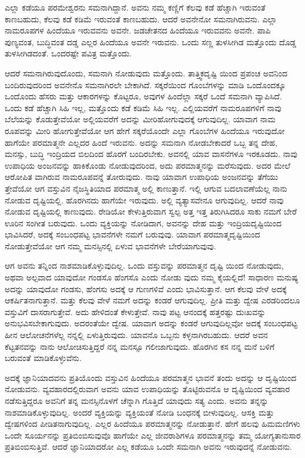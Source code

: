 ಎಲ್ಲಾ ಕಡೆಯೂ ಪರಮೇಶ್ವರನು ಸಮನಾಗಿದ್ದಾನೆ. ಅವನು ನಮ್ಮ ಕಣ್ಣಿಗೆ ಕೆಲವು ಕಡೆ ಹೆಚ್ಚಾಗಿ ಇರುವಂತೆ ಕಾಣಬಹುದು, ಕೆಲವು ಕಡೆ ಕಡಿಮೆ ಇರುವಂತೆ ಕಾಣಬಹುದು. ಆದರೆ ಅವನೇನೋ ಸಮನಾಗಿರುವನು. ಎಲ್ಲಾ ನಾಮರೂಪಗಳ ಹಿಂದೆಯೂ ಇರುವವನು ಅವನೇ. ಜಡಚೇತನದ ಹಿಂದೆಯೂ ಇರುವವನು ಅವನೇ. ಪಾಪಿ ಪುಣ್ಯವಂತ, ಬುದ್ಧಿವಂತ ದಡ್ಡ ಎಲ್ಲರ ಹಿಂದೆಯೂ ಅವನೇ ಇರುವನು. ಒಂದು ಸಣ್ಣ ತುಳಸೀಗಿಡ ಮತ್ತೊಂದು ದೊಡ್ಡ ತುಳಸೀಗಿಡದಂತೆ. ಒಂದರಷ್ಟೇ ಪವಿತ್ರ ಮತ್ತೊಂದು.

ಆದರೆ ಸಮನಾಗಿರುವುದೊಂದು, ಸಮನಾಗಿ ನೋಡುವುದು ಮತ್ತೊಂದು. ತಾತ್ತ್ವಿಕದೃಷ್ಟಿ ಯಿಂದ ಪ್ರಪಂಚ ಅವನಿಂದ ಬಂದಿರುವುದರಿಂದ ಅವನೇನೊ ಸಮನಾಗಿರಲೇ ಬೇಕಾಗಿದೆ. ಸಕ್ಕರೆಯಿಂದ ಗೊಂಬೆಗಳನ್ನು ಮಾಡಿ ಒಂದೊಂದಕ್ಕೂ ಒಂದೊಂದು ಹೆಸರು ಮತ್ತು ಆಕಾರಗಳನ್ನು ಕೊಟ್ಟರೂ, ಅವುಗಳ ಹಿಂದೆಲ್ಲಾ ಸಕ್ಕರೆ ಒಂದೆ ಸಮನಾಗಿ ವ್ಯಾಪಿಸಿದೆ. ಒಂದು ಕಡೆ ಹೆಚ್ಚಾಗಿ ಸಿಹಿ ಇಲ್ಲ, ಮತ್ತೊಂದು ಕಡೆ ಕಡಿಮೆ ಸಿಹಿ ಇಲ್ಲ. ಎಲ್ಲಿಯವರೆಗೆ ನಾಮರೂಪಗಳಿಗೆ ನಾವು ಬೆಲೆಯನ್ನು ಕೊಡುತ್ತೇವೆಯೋ ಅಲ್ಲಿಯವರೆಗೆ ಅದನ್ನು ಮೀರಿಹೋಗುವುದಕ್ಕೆ ಆಗುವುದಿಲ್ಲ. ಯಾವಾಗ ನಾಮ ರೂಪವನ್ನು ಮೀರಿ ಹೋಗುತ್ತೇವೆಯೋ ಆಗ ಹೇಗೆ ಸಕ್ಕರೆಯೊಂದೇ ಎಲ್ಲಾ ಗೊಂಬೆಗಳ ಹಿಂದೆಯೂ ಇರುವುದೋ ಹಾಗೆಯೇ ಪರಮಾತ್ಮನೇ ಎಲ್ಲದರ ಹಿಂದೆ ಇರುವನು. ಅದನ್ನು ಸಮನಾಗಿ ನೋಡಬೇಕಾದರೆ ಒಬ್ಬ ತನ್ನ ದೇಹ, ಮನಸ್ಸು, ಬುದ್ಧಿ ಇಂದ್ರಿಯದ ಬಿಲದಿಂದ ಹೊರಗೆ ಬಂದಿರಬೇಕು. ಅವನಲ್ಲಿ ಯಾವ ವಾಸನೆಗಳೂ ಇರಕೂಡದು. ನಾವು ಉಪಾಧಿಯ ಅಂಜನವನ್ನು ಹಾಕಿಕೊಂಡು ನೋಡುವುದರಿಂದ, ಅದು ಪರಮಾತ್ಮನನ್ನು ಮರೆಸುವುದು. ಅದರ ಮೇಲೆ ಆರೋಪಿತ ವಾಗಿರುವ ನಾಮರೂಪವನ್ನೆ ತೋರುವುದು. ನಾವು ಯಾವಾಗ ಉಪಾಧಿಯ ಅಂಜನವನ್ನು ತೆಗೆಯು ತ್ತೇವೆಯೋ ಆಗ ವಸ್ತುವಿನ ನೈಜಸ್ಥಿತಿಯಾದ ಪರಮಾತ್ಮ ಅಲ್ಲಿ ಕಾಣುತ್ತಾನೆ. ಇಲ್ಲಿ ಆಗುವ ಬದಲಾವಣೆಯೆಲ್ಲ ನಾನು ನೋಡುವ ದೃಷ್ಟಿಯಲ್ಲಿ. ಹೊರಗಿನದು ಹಾಗೆಯೇ ಇರುವುದು. ಅಲ್ಲಿ ವ್ಯತ್ಯಾಸವೇನೂ ಆಗುವುದಿಲ್ಲ. ಆದರೆ ನಾವು ನೋಡುವ ದೃಷ್ಟಿಯಲ್ಲಿ ಕಾಣುವುದು. ರೇಡಿಯೋ ಕೇಳುತ್ತಿರುವಾಗ ಸ್ವಲ್ಪ ಅತ್ತ ಇತ್ತ ತಿರುಗಿಸಿದರೂ ಸಾಕು ನಮಗೆ ಬೇರೆ ಊರಿನ ಸಂಗೀತ ಬರುವುದು. ಒಂದು ವ್ಯಕ್ತಿಯನ್ನು ನೋಡಿದಾಗ, ಅವನನ್ನು ದೇಹ ಮತ್ತು ಇಂದ್ರಿಯದೃಷ್ಟಿಯಿಂದ ಭಾವಿಸಿದರೆ, ಅದಕ್ಕೆ ಸಂಬಂಧಪಟ್ಟ ಭಾವನೆಗಳೇ ನಮಗೆ ಬರುವುವು. ಯಾವಾಗ ಪರಮಾತ್ಮದೃಷ್ಟಿಯಿಂದ ನೋಡುತ್ತೇವೆಯೋ ಆಗ ನಮ್ಮ ಮನಸ್ಸಿನಲ್ಲಿ ಏಳುವ ಭಾವನೆಗಳೇ ಬೇರೆಯಾಗುವುವು.

ಆಗ ಅವನು ತನ್ನಿಂದ ನಾಶಮಾಡಿಕೊಳ್ಳುವುದಿಲ್ಲ. ಒಂದು ವಸ್ತುವನ್ನು ಪರಮಾತ್ಮನ ದೃಷ್ಟಿ ಯಿಂದ ನೋಡುವುದು, ಅಥವಾ ಅಲ್ಪವಾದ ಯಾವುದೋ ಗಂಡಸೊ ಹೆಂಗಸೊ ಎಂದು ನೋಡು ವುದು ನಮ್ಮ ಕೈಯಲ್ಲಿದೆ! ಸಾಧಾರಣ ಮನುಷ್ಯ ಅದನ್ನು ಯಾವುದೋ ಗಂಡಸು, ಹೆಂಗಸು ಅದಕ್ಕೆ ಆ ಗುಣಗಳಿವೆ ಎಂದು ಭಾವಿಸುತ್ತಾನೆ. ಆಗ ಕೆಲವು ವೇಳೆ ಅದಕ್ಕೆ ಆಕರ್ಷಿತನಾಗುತ್ತಾನೆ. ಮತ್ತು ಕೆಲವು ವೇಳೆ ನಮಗೆ ಅದನ್ನು ಕಂಡರೆ ಆಗುವುದಿಲ್ಲ. ಪ್ರೀತಿ ಮತ್ತು ದ್ವೇಷ ಎರಡರಿಂದಲೂ ವಸ್ತುವಿಗೆ ದಾಸರಾಗುತ್ತೇವೆ. ಅದು ಹೇಳಿದಂತೆ ಕೇಳುತ್ತೇವೆ. ನಾವು ಪಟ್ಟ ಆನಂದಕ್ಕೆ ಹತ್ತರಷ್ಟು ದುಃಖವನ್ನು ಅನುಭವಿಸಬೇಕಾಗುವುದು. ಅದರಂತೆಯೇ ದ್ವೇಷ. ಯಾವಾಗ ಅದನ್ನು ಕಂಡರೆ ಆಗುವುದಿಲ್ಲವೋ ಅದಕ್ಕೆ ಸಂಬಂಧಪಟ್ಟ ಹೀನ ಆಲೋಚನೆಗಳೆಲ್ಲ ನನ್ನಲ್ಲಿ ಏಳುತ್ತಿರುವುದು. ಯಾವನೊ ಒಬ್ಬನು ಕಳ್ಳನಾಗಿರಬಹುದು. ಆದರೆ ಅವನ ಕೆಟ್ಟತನವನ್ನು ನಾನು ಆಲೋಚಿಸುತ್ತಿದ್ದರೆ ನನ್ನ ಮನಸ್ಸೂ ಗಲೀಜಾಗುವುದು. ಹೊರಗಿನ ಕಸ ನನ್ನ ಮನೆ ಬಳಿಗೆ ಬರುವಂತೆ ಮಾಡಿಕೊಳ್ಳುವೆನು.

ಅದಕ್ಕೆ ಜ್ಞಾನಿಯಾದವನು ಪ್ರತಿಯೊಂದು ವಸ್ತುವಿನ ಹಿಂದೆಯೂ ಪರಮಾತ್ಮನ ಭಾವನೆ ತಂದು ಅದನ್ನು ಆ ದೃಷ್ಟಿಯಿಂದ ನೋಡುವನು. ವ್ಯವಹಾರದಲ್ಲಿರುವಾಗ ಅವನು ಯಾವ ಉಪಾಧಿಯನ್ನು ತೊಟ್ಟಿರುವನೊ ಆ ದೃಷ್ಟಿಯಿಂದ ವ್ಯವಹಾರ ನಡೆಸುತ್ತಿದ್ದರೂ ಅವನಿಗೆ ತನ್ನ ಮನಸ್ಸಿನೊಳಗೆ ಚೆನ್ನಾಗಿ ಗೊತ್ತಿದೆ ಯಾವುದು ಸತ್ಯ ಎಂದು. ಅವನು ತನ್ನನ್ನು ನಾಶಮಾಡಿಕೊಳ್ಳುವುದಿಲ್ಲ. ಅಂದರೆ ವ್ಯಕ್ತಿಯನ್ನು ವ್ಯಕ್ತಿಯಂತೆ ನೋಡಿ ಬಂಧನಕ್ಕೆ ಬೀಳುವುದಿಲ್ಲ. ಆಸಕ್ತಿ ಮತ್ತು ದ್ವೇಷಗಳಿಂದ ಪೀಡಿತನಾಗುವುದಿಲ್ಲ. ಎಲ್ಲರ ಹಿಂದೆಯೂ ಪರಮಾತ್ಮನನ್ನು ನೋಡುತ್ತಾನೆ. ಹೇಗೆ ಹಲವು ಹಿಮಮಣಿಗಳು ಒಂದೇ ಸೂರ್ಯನನ್ನು ಪ್ರತಿಬಿಂಬಿಸುವುವೊ ಹಾಗೆಯೇ ಎಲ್ಲ ಜೀವರಾಶಿಗಳೂ ಪರಮಾತ್ಮನನ್ನು ತಮ್ಮ ಯೋಗ್ಯತಾನುಸಾರ ಪ್ರತಿಬಿಂಬಿಸುತ್ತಿವೆ. ಆದರೆ ಜ್ಞಾನಿಯಾದರೋ ಎಲ್ಲ ಕಡೆಯೂ ಒಂದೇ ಸಮನಾಗಿ ಅವನು ಇರುವುದನ್ನೆ ನೋಡುವನು.

